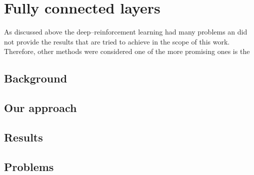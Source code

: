 \chapter{Fully connected layers}
As discussed above the deep--reinforcement learning had many problems an did not provide the results that are tried to achieve in the scope of this work.
Therefore, other methods were considered one of the more promising ones is the %

\section{Background}


\section{Our approach}

\section{Results}

\section{Problems}